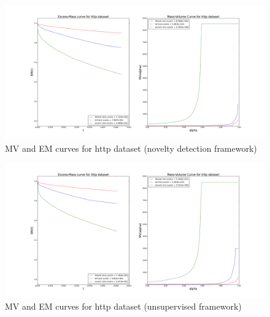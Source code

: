 \begin{figure}[!ht]
\label{evaluation:mv_em_http}
  \centering
  \caption{MV and EM curves for http dataset (novelty detection framework)}
  \includegraphics[trim=172 52 165 70, clip, width=\linewidth]{fig_source/evaluation_fig/mv_em_http_supervised_09_factorized.png}
\end{figure}
\begin{figure}[!ht]
\label{evaluation:mv_em_http_unsupervised}
  \centering
  \caption{MV and EM curves for http dataset (unsupervised framework)}
  \includegraphics[trim=172 52 165 70, clip, width=\linewidth]{fig_source/evaluation_fig/mv_em_http_unsupervised_09_factorized.png}
\end{figure}


